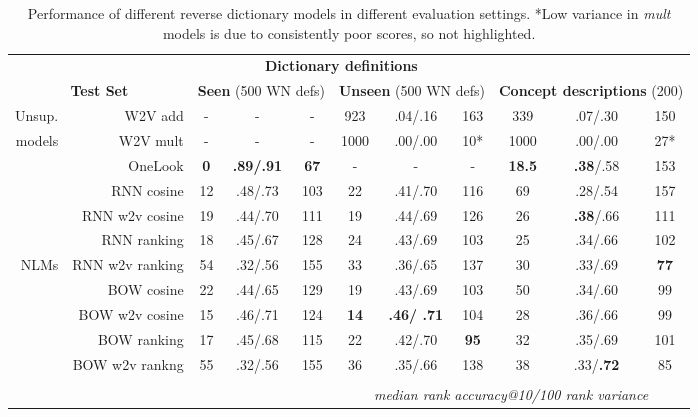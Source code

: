 \begin{table*}[ht]
    \centering
{\small
\hfill{}
\begin{tabular}{r|r|ccc|ccc|ccc|}

\multicolumn{2}{c}{}& \multicolumn{6}{|c|}{\bf Dictionary definitions} \\
\multicolumn{2}{c}{\textbf{Test Set }}&\multicolumn{3}{|c|}{\textbf{Seen} (500 WN defs)}& \multicolumn{3}{|c|}{\textbf{Unseen} (500 WN defs)} & \multicolumn{3}{|c|}{\textbf{Concept descriptions} (200)} \\

\hline

\rule{0pt}{2ex} 

Unsup. & W2V add & - & - & - & 923 & .04/.16 & 163 & 339 & .07/.30 & 150    \\
models  & W2V mult &- &- & -& 1000 & .00/.00 & 10* &   1000 & .00/.00 & 27* \\
\hdashline 
\rule{0pt}{2ex} 
& OneLook & \bf 0 & \bf .89/.91 & \bf 67  & - & - & - &  \bf 18.5 &  {\bf .38}/.58 & 153    \\
\hdashline 
\rule{0pt}{2ex} 
 & RNN cosine & 12 & .48/.73 & 103 &  22 & .41/.70 & 116 & 69 & .28/.54 & 157 \\
 & RNN w2v cosine & 19 & .44/.70 & 111 & 19 & .44/.69 & 126 & 26 & {\bf .38}/.66 & 111  \\
 & RNN ranking & 18 & .45/.67 & 128 &	24 & .43/.69 & 103 & 25 & .34/.66 & 102 \\
NLMs & RNN w2v ranking & 54 & .32/.56 & 155 & 33 & .36/.65 & 137 &	30 & .33/.69 & \bf 77 \\
& BOW cosine &22 & .44/.65 & 129 & 19 & .43/.69 & 103 & 50 & .34/.60 &  99 \\
& BOW w2v cosine & 15 & .46/.71 & 124 &  \bf14 & \bf .46/ .71 &  104	 & 28 & .36/.66 &  99 \\
& BOW ranking & 17 & .45/.68 &  115 &	 22 & .42/.70 & \bf 95 &	32 & .35/.69 & 101   \\
& BOW w2v rankng & 55 & .32/.56 & 155 &	36 & .35/.66 & 138 &	38 & .33/{\bf .72} & 85 \\

\hline 

\multicolumn{11}{c}{} \\
\multicolumn{5}{c}{}& \multicolumn{6}{|c|}{\emph{median rank \hspace{5mm}   accuracy@10/100 \hspace{5mm}   rank variance} } \\

\end{tabular}}
\caption{Performance of different reverse dictionary models in different evaluation settings. *Low variance in \emph{mult} models is due to consistently poor scores, so not highlighted.}
\label{results}
\end{table*}



